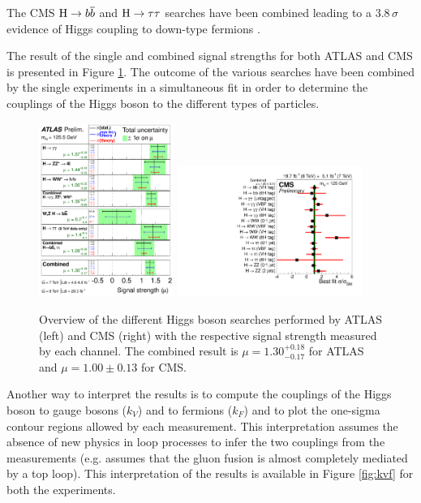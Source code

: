 The CMS $\mathrm{H} \rightarrow b\overline{b}$ and $\mathrm{H} \rightarrow \tau \tau$ searches have been combined leading to a $3.8\,\sigma$ evidence of Higgs coupling to down-type fermions \cite{Chatrchyan:2014vua}.

The result of the single and combined signal strengths for both ATLAS \cite{ATLASCONF:2014009} and CMS \cite{CMS:2014ega} is presented in Figure \ref{fig:combination}.
The outcome of the various searches have been combined by the single experiments in a simultaneous fit in order to determine the couplings of the Higgs boson to the different types of particles. 

\begin{figure}
        \centering
	\includegraphics[width=0.39\textwidth]{1_Introduction_Th_and_Exp/pics/fig_01.pdf}
	\includegraphics[width=0.54\textwidth]{1_Introduction_Th_and_Exp/pics/sqr_mlz_ccc_mH125.pdf}
       \caption{Overview of the different Higgs boson searches performed by ATLAS (left) and CMS (right) with the respective signal strength measured by each channel. The combined result is $\mu = 1.30^{+0.18}_{-0.17}$ for ATLAS and $\mu = 1.00 \pm 0.13$ for CMS.}
       \label{fig:combination}
\end{figure}

Another way to interpret the results is to compute the couplings of the Higgs boson to gauge bosons ($k_V$) and to fermions ($k_F$) and to plot the one-sigma contour regions allowed by each measurement. This interpretation assumes the absence of new physics in loop processes to infer the two couplings from the measurements (e.g. assumes that the gluon fusion is almost completely mediated by a top loop). This interpretation of the results is available in Figure \ref{fig:kvf} for both the experiments.

